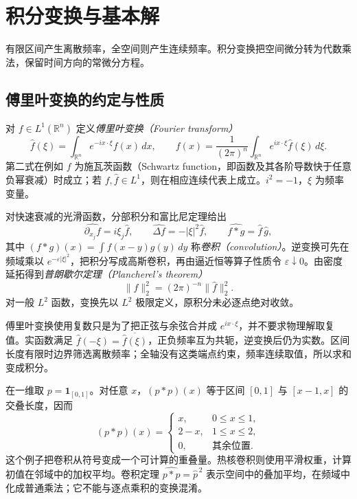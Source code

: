 \setcounter{chapter}{11} %
\chapter{积分变换与基本解}
\label{chap:transforms}

有限区间产生离散频率，全空间则产生连续频率。积分变换把空间微分转为代数乘法，保留时间方向的常微分方程。

\section{傅里叶变换的约定与性质}
对 $f\in L^1(\mathbb R^n)$ 定义\emph{傅里叶变换（Fourier transform）}
\begin{equation}
 \widehat f(\xi)=\int_{\mathbb R^n}e^{-ix\cdot\xi}f(x)\,dx,
 \qquad
 f(x)=\frac1{(2\pi)^n}\int_{\mathbb R^n}e^{ix\cdot\xi}\widehat f(\xi)\,d\xi.
 \label{eq:fourier-convention}
\end{equation}
第二式在例如 $f$ 为施瓦茨函数（Schwartz function，即函数及其各阶导数快于任意负幂衰减）时成立；若 $f,\widehat f\in L^1$，则在相应连续代表上成立。$i^2=-1$，$\xi$ 为频率变量。

对快速衰减的光滑函数，分部积分和富比尼定理给出
\[
 \widehat{\partial_{x_j}f}=i\xi_j\widehat f,\qquad
 \widehat{\Delta f}=-|\xi|^2\widehat f,\qquad
 \widehat{f*g}=\widehat f\,\widehat g,
\]
其中 $(f*g)(x)=\int f(x-y)g(y)\,dy$ 称\emph{卷积（convolution）}。逆变换可先在频域乘以 $e^{-\varepsilon|\xi|^2}$，把积分写成高斯卷积，再由逼近恒等算子性质令 $\varepsilon\downarrow0$。由密度延拓得到\emph{普朗歇尔定理（Plancherel's theorem）}
\[
 \|f\|_2^2=(2\pi)^{-n}\|\widehat f\|_2^2.
\]
对一般 $L^2$ 函数，变换先以 $L^2$ 极限定义，原积分未必逐点绝对收敛。

傅里叶变换使用复数只是为了把正弦与余弦合并成 $e^{ix\cdot\xi}$，并不要求物理解取复值。实函数满足 $\widehat f(-\xi)=\overline{\widehat f(\xi)}$，正负频率互为共轭，逆变换后仍为实数。区间长度有限时边界筛选离散频率；全轴没有这类端点约束，频率连续取值，所以求和变成积分。

\begin{example}[卷积如何叠加平移响应]
在一维取 $p=\mathbf1_{[0,1]}$。对任意 $x$，$(p*p)(x)$ 等于区间 $[0,1]$ 与 $[x-1,x]$ 的交叠长度，因而
\[
 (p*p)(x)=\begin{cases}
 x,&0\le x\le1,\\ 2-x,&1\le x\le2,\\0,&\text{其余位置}.
 \end{cases}
\]
这个例子把卷积从符号变成一个可计算的重叠量。热核卷积则使用平滑权重，计算初值在邻域中的加权平均。卷积定理 $\widehat{p*p}=\widehat p^{\,2}$ 表示空间中的叠加平均，在频域中化成普通乘法；它不能与逐点乘积的变换混淆。
\end{example}

